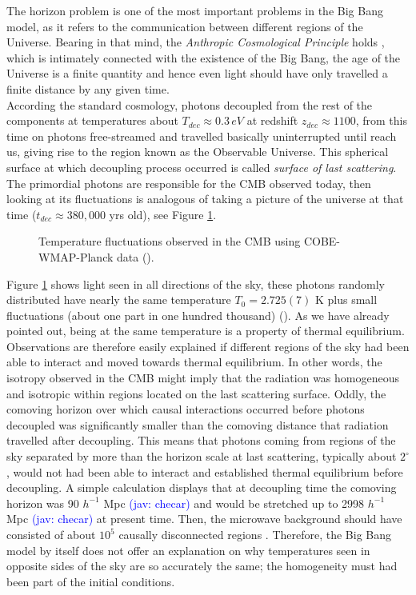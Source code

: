 \documentclass{rmaa}
\newcommand{\jav}[1]{\textcolor{blue}{(jav: #1)}}
\begin{document}
The horizon problem is one of the most important problems in the Big Bang model,
as it refers to the communication between different regions of the Universe. 
%
Bearing in that mind, the \textit{Anthropic Cosmological Principle} holds 
\citep{Barrow, Coles}, which is intimately connected
with the existence of the Big Bang, the age of the Universe is a finite quantity and hence
even light should have only travelled a finite distance by any given time. 
\\

According the standard cosmology, photons decoupled from the rest of the 
components at temperatures about $T_{dec}\approx 0.3\, eV$ at redshift
$z_{dec} \approx 1100$, from this time on photons free-streamed and travelled basically
 uninterrupted until reach us, giving rise to the region known as the Observable Universe.
 This spherical surface at which decoupling process occurred is called 
\textit{surface of last scattering}.
The primordial photons are responsible for the CMB observed today, then looking at its
fluctuations is analogous of taking a picture of the universe at that time 
($t_{dec}\approx 380,000$ yrs old), see Figure \ref{fig:wmap5}.
\\

\begin{figure}[ht] 
\centerline{ \epsfxsize=210pt  }
\caption{Temperature fluctuations observed in the CMB using 
 COBE-WMAP-Planck data (\citep{Gold}\citep{Planckxi}\citep{Planckxvi}).}
\label{fig:wmap5}
\end{figure}

Figure \ref{fig:wmap5} shows light seen in all directions of the sky, 
these photons randomly distributed have nearly the same temperature $T_0= 2.725(7)$ K
plus small fluctuations (about one part in one hundred thousand) (\cite{Apar,Planckck}).
 As we have already pointed out, being at the same 
temperature is a property of thermal equilibrium. Observations are therefore easily explained 
if different regions of the sky had been able to interact and moved towards thermal 
equilibrium. In other words, the isotropy observed in the CMB might imply that the radiation was 
homogeneous and isotropic within regions located on the last scattering surface.
Oddly, the comoving horizon over which causal interactions occurred before  
photons decoupled was significantly smaller than the comoving distance 
that radiation travelled after decoupling.
This means that photons coming from regions of the sky separated by more than the
horizon scale at last scattering, typically about $2^\circ$, would not 
had been  able to interact and established thermal equilibrium before decoupling. 
A simple calculation displays that at decoupling time the comoving horizon was
90 $h^{-1}$ Mpc \jav{checar} and would be stretched up to 2998 $h^{-1}$ Mpc \jav{checar} at present time.
Then, the microwave background should have consisted of about $10^5$ causally 
disconnected regions \citep{McCoy}.  
Therefore, the Big Bang model by itself does not offer an explanation on why
temperatures seen in opposite sides of the sky are so accurately the same; the homogeneity
must had been part of the initial conditions. 
\\
\end{document}
